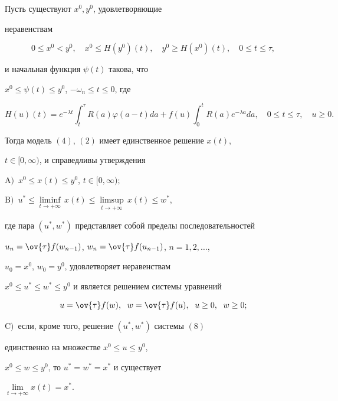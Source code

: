 \begin{lem}


Пусть существуют $x^{0}, y^{0}$, удовлетворяющие


неравенствам


\begin{equation}


0 \leq x^{0} < y^{0}, \quad x^{0} \leq H(y^{0})(t),


\quad y^{0} \geq H(x^{0})(t),


\quad 0 \leq t \leq \tau,


\end{equation}


и начальная функция $\psi(t)$ такова, что


$x^{0} \leq \psi(t) \leq y^{0}$, $ - \omega_{n} \leq t \leq 0$, где


$$


H(u)(t)= e^{ - \lambda t} \int_{t}^{\tau} R(a) \varphi(a-t)da+


f(u) \int_{0}^{t} R(a) e^{- \lambda a}da, \quad 0 \leq t \leq \tau,


\quad u \geq 0.


$$


Тогда модель $(4)$, $(2)$ имеет единственное решение $x(t)$,


$t \in [0, \infty)$, и справедливы утверждения


$\mathrm A)$~$x^{0} \leq x(t) \leq y^{0}$, $t \in [0, \infty);$


$\mathrm B)$~$u^{*} \leq \underset{t\to+\infty}{\liminf}\,x(t)


\leq \underset{t\to+\infty}\limsup\, x(t) \leq w^{*}$,


где пара $(u^{*}, w^{*})$ представляет собой пределы последовательностей


$u_{n}=\ov{\tau} f(w_{n-1})$, $w_{n}=\ov{\tau} f(u_{n-1})$, $n=1, 2,\dotsc$,


$u_{0}=x^{0}$, $w_{0}=y^{0}$, удовлетворяет неравенствам


$x^{0} \leq u^{*} \leq w^{*} \leq y^{0}$ и является решением системы уравнений


\begin{equation}


u=\ov{\tau} f(w), \ \; w=\ov{\tau} f(u), \ \; u \geq 0,


\ \; w \geq 0;


\end{equation}


$\mathrm C)$~если, кроме того, решение $(u^{*}, w^{*})$ системы $(8)$


единственно на множестве $x^{0} \leq u \leq y^{0}$,


$x^{0} \leq w \leq y^{0}$, то $u^{*}=w^{*}=x^{*}$ и существует


$\lim\limits_{t\to+\infty} x(t)=x^{*}$.


\end{lem}





